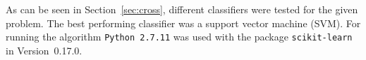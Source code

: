 As can be seen in Section~\ref{sec:cross}, different classifiers were
tested for the given problem. The best performing classifier was a support
vector machine (SVM). For running the algorithm \texttt{Python~2.7.11}
was used with the package \texttt{scikit-learn} in Version~0.17.0.